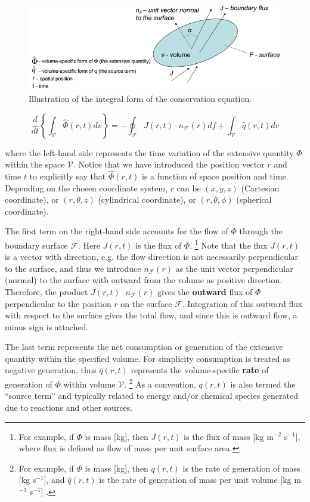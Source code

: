 \documentclass[a4paper,11pt]{article}
\theoremstyle{definition}
\begin{document}
\begin{figure} [!h]
 \begin{center}
	\includegraphics[width=.6\textwidth]{integral}
 \end{center}
 \caption{Illustration of the integral form of the conservation equation.} 
 \label{fig:integral}
\end{figure} 

\begin{equation} \label{eq:conserv_integral}
	\frac{d}{d t} \left\{ \int_{\mathcal{V}} \hat{\Phi} (r, t) dv \right\} = -\oint_{\mathcal{F}} J(r,t) \cdot n_{\mathcal{F}}(r) d f
		+ \int_{\mathcal{V}} \hat{q}(r, t) dv
\end{equation}

\noindent where the left-hand side represents the time variation of the extensive quantity $\Phi$ within the space $\mathcal{V}$. 
Notice that we have introduced the position vector $r$ and time $t$ to explicitly say that $\hat{\Phi} (r,t)$ is a function
of space position and time. Depending on the chosen coordinate system, $r$ can be $(x, y, z)$ (Cartesian coordinate), 
or $(r, \theta, z)$ (cylindrical coordinate), or $(r, \theta, \phi)$ (spherical coordinate).

The first term on the right-hand side accounts for the flow of $\Phi$ 
through the boundary surface $\mathcal{F}$. Here $J(r,t)$ is the flux of $\Phi$.
\footnote{For example, if $\Phi$ is mass [kg], then $J(r,t)$ is the flux of mass [kg m$^{-2}$ s$^{-1}$], where flux is defined as flow of mass per unit surface area.}
Note that the flux $J(r,t)$ is a vector with direction, e.g. the flow direction is not necessarily perpendicular to the surface, and thus we introduce
$n_{\mathcal{F}}(r)$ as the unit vector perpendicular (normal) to the surface with outward from the volume as positive direction.
Therefore, the product $J(r,t) \cdot n_{\mathcal{F}}(r)$ gives the \textbf{outward} flux of $\Phi$ perpendicular to the position $r$ on the surface
$\mathcal{F}$. Integration of this outward flux with respect to the surface gives the total flow, and since this is outward flow, a minus sign is attached.

The last term represents the net consumption or generation of the extensive quantity within the specified volume.
For simplicity consumption is treated as negative generation, thus $\hat{q}(r, t)$ represents the volume-specific \textbf{rate} of generation
of $\Phi$ within volume $\mathcal{V}$.
\footnote{For example, if $\Phi$ is mass [kg], then $q(r, t)$ is the rate of generation of mass [kg s$^{-1}$], and
$\hat{q}(r, t)$ is the rate of generation of mass per unit volume [kg m$^{-3}$ s$^{-1}$] .}
As a convention, $q(r, t)$ is also termed the ``source term'' and typically related to energy and/or chemical species generated due to reactions
and other sources.
\end{document}
